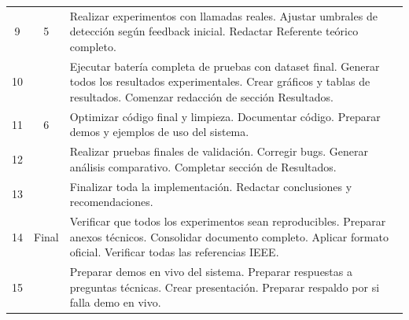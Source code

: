 \begin{table}[!t]
\begin{tabular}{c c p{5cm}}
9  & 5      & Realizar experimentos con llamadas reales. Ajustar umbrales de detección según feedback inicial. Redactar Referente teórico completo. \\
10 &        & Ejecutar batería completa de pruebas con dataset final. Generar todos los resultados experimentales. Crear gráficos y tablas de resultados. Comenzar redacción de sección Resultados. \\
11 & 6      & Optimizar código final y limpieza. Documentar código. Preparar demos y ejemplos de uso del sistema. \\
12 &        & Realizar pruebas finales de validación. Corregir bugs. Generar análisis comparativo. Completar sección de Resultados. \\
13 &        & Finalizar toda la implementación. Redactar conclusiones y recomendaciones. \\
14 & Final  & Verificar que todos los experimentos sean reproducibles. Preparar anexos técnicos. Consolidar documento completo. Aplicar formato oficial. Verificar todas las referencias IEEE. \\
15 &        & Preparar demos en vivo del sistema. Preparar respuestas a preguntas técnicas. Crear presentación. Preparar respaldo por si falla demo en vivo. \\
\bottomrule
\end{tabular}
\end{table}
